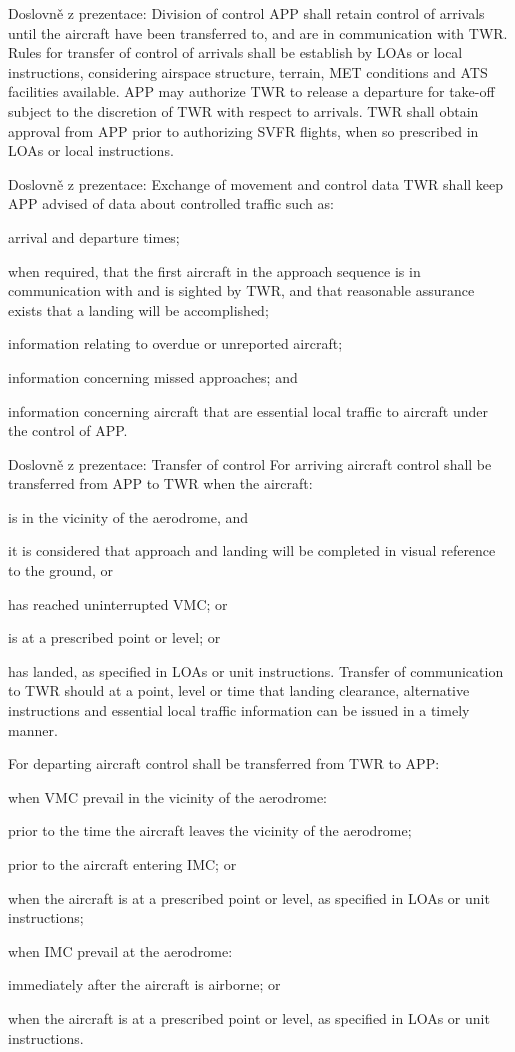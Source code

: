 Doslovně z prezentace:
Division of control
APP shall retain control of arrivals until the aircraft have been transferred to, and are in communication with TWR. Rules for transfer of control of arrivals shall be establish by LOAs or local instructions, considering airspace structure, terrain, MET conditions and ATS facilities available.
APP may authorize TWR to release a departure for take-off subject to the discretion of TWR with respect to arrivals.
TWR shall obtain approval from APP prior to authorizing SVFR flights, when so prescribed in LOAs or local instructions. \cite[Chapter 10.1.4.1]{doc4444}

Doslovně z prezentace:
Exchange of movement and control data
TWR shall keep APP advised of data about controlled traffic such as:
\bitem
\item arrival and departure times;
\item when required, that the first aircraft in the approach sequence is in  	communication with and is sighted by TWR, and that reasonable 	assurance exists that a landing will be accomplished;
\item information relating to overdue or unreported aircraft;
\item information concerning missed approaches; and
\item information concerning aircraft that are essential local traffic to aircraft 	under the control of APP.
\eitem
\cite[Chapter 10.1.4.2]{doc4444}

Doslovně z prezentace:
Transfer of control
For arriving aircraft control shall be transferred from APP to TWR when the aircraft:
\bitem
\item is in the vicinity of the aerodrome, and
	\bitem
	\item it is considered that approach and landing will be completed in visual reference to the ground, or
	\item has reached uninterrupted VMC; or
	\eitem
\item is at a prescribed point or level; or
\item has landed, 
	as specified in LOAs or unit instructions.
\eitem
Transfer of communication to TWR should at a point, level or time that landing clearance, alternative instructions and essential local traffic information can be issued in a timely manner.

For departing aircraft control shall be transferred from TWR to APP:
\bitem
\item when VMC prevail in the vicinity of the aerodrome:
	\bitem
	\item prior to the time the aircraft leaves the vicinity of the aerodrome;
	\item prior to the aircraft entering IMC; or
	\item when the aircraft is at a prescribed point or level, as specified in LOAs or unit instructions; 
	\eitem
\item when IMC prevail at the aerodrome:
	\bitem
	\item immediately after the aircraft is airborne; or
	\item when the aircraft is at a prescribed point or level, as specified in LOAs or unit instructions.
	\eitem
\eitem
\cite[Chapter 4.3.2]{doc4444}

